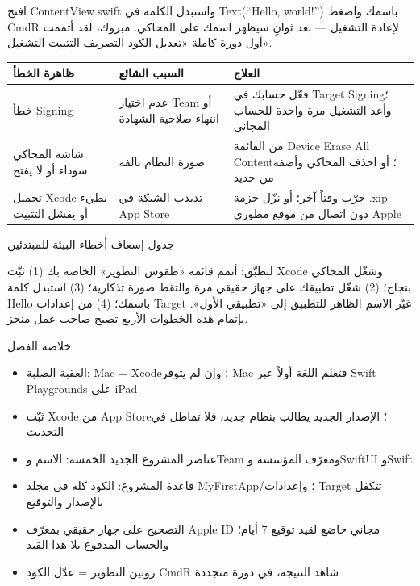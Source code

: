 

افتح ContentView.swift واستبدل الكلمة في Text(“Hello, world!”) باسمك واضغط CmdR لإعادة التشغيل — بعد ثوانٍ سيظهر اسمك على المحاكي. مبروك، لقد أتممت أول دورة كاملة «تعديل الكود التصريف التثبيت التشغيل».

\begin{center}
\begin{tabularx}{\linewidth}{|X|X|X|}
\hline
\textbf{ظاهرة الخطأ} & \textbf{السبب الشائع} & \textbf{العلاج} \tabularnewline
\hline
خطأ Signing & عدم اختيار Team أو انتهاء صلاحية الشهادة & فعّل حسابك في Target Signing؛ وأعد التشغيل مرة واحدة للحساب المجاني \tabularnewline
شاشة المحاكي سوداء أو لا يفتح & صورة النظام تالفة & من القائمة Device Erase All Content؛ أو احذف المحاكي وأضفه من جديد \tabularnewline
تحميل Xcode بطيء أو يفشل التثبيت & تذبذب الشبكة في App Store & جرّب وقتاً آخر؛ أو نزّل حزمة .xip دون اتصال من موقع مطوري Apple \tabularnewline
\hline
\end{tabularx}
\end{center}

\begin{center}\small\color{gray}جدول إسعاف أخطاء البيئة للمبتدئين\end{center}

\begin{tcbpractice}{لنطبّق: أتمم قائمة «طقوس التطوير» الخاصة بك}
(1) ثبّت Xcode وشغّل المحاكي بنجاح؛ (2) شغّل تطبيقك على جهاز حقيقي مرة والتقط صورة تذكارية؛ (3) استبدل كلمة Hello باسمك؛ (4) من إعدادات Target غيّر الاسم الظاهر للتطبيق إلى «تطبيقي الأول». بإتمام هذه الخطوات الأربع تصبح صاحب عمل منجز.

\end{tcbpractice}

\begin{tcbsummary}{خلاصة الفصل}
\begin{itemize}
  \item العقبة الصلبة: Mac + Xcode؛ وإن لم يتوفر Mac فتعلم اللغة أولاً عبر Swift Playgrounds على iPad
  \item ثبّت Xcode من App Store؛ الإصدار الجديد يطالب بنظام جديد، فلا تماطل في التحديث
  \item عناصر المشروع الجديد الخمسة: الاسم وTeam ومعرّف المؤسسة وSwiftUI وSwift
  \item قاعدة المشروع: الكود كله في مجلد MyFirstApp/؛ وإعدادات Target تتكفل بالإصدار والتوقيع
  \item التصحيح على جهاز حقيقي بمعرّف Apple ID مجاني خاضع لقيد توقيع 7 أيام؛ والحساب المدفوع بلا هذا القيد
  \item روتين التطوير = عدّل الكود CmdR شاهد النتيجة، في دورة متجددة
\end{itemize}

\end{tcbsummary}
